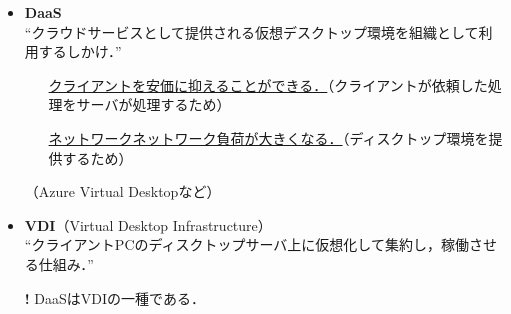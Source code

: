 \begin{frame}[t]{\ftitle}
    \begin{itemize}
        \item \textbf{DaaS}\\
              ``クラウドサービスとして提供される仮想デスクトップ環境を組織として利用するしかけ．''\hfill\cite{ISディジタル辞典DaaS}
              \begin{itemize}
                  \item[{\bfseries\Large\cmark}] \underline{クライアントを安価に抑えることができる．}（クライアントが依頼した処理をサーバが処理するため）
                  \item[{\bfseries\Large\xmark}] \underline{ネットワークネットワーク負荷が大きくなる．}（ディスクトップ環境を提供するため）
              \end{itemize}
              （Azure Virtual Desktopなど）\\
              \hrulefill
        \item \textbf{VDI}（Virtual Desktop Infrastructure）\\
              ``クライアントPCのディスクトップサーバ上に仮想化して集約し，稼働させる仕組み．''\hfill\cite{ISディジタル辞典VDI}
              \item[\textbf{\large !}]DaaSはVDIの一種である．
    \end{itemize}
\end{frame}
